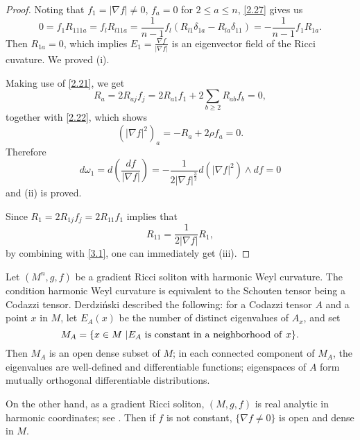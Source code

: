 \documentclass{amsart}
\theoremstyle{definition}
\theoremstyle{remark}
\numberwithin{equation}{section}
\begin{document}
	\begin{proof}
		Noting that 
		$f_1=|\nabla f|\neq 0$, $f_a=0$ for $2\leq a\leq n$, \eqref{2.27} gives us
		\[
		0=f_1 R_{111a}= f_l R_{l11a}=\frac{1}{n - 1} f_l \left( R_{l1} \delta_{1a} - R_{la} \delta_{11}\right) =-\frac{1}{n - 1}f_1 R_{1a}.	
		\]
		Then $R_{1a}=0$, which implies $E_1= \frac{\nabla f }{|\nabla f | }$ is an eigenvector field of the Ricci cuvature. We proved {\rm (i)}.
		
		Making use of \eqref{2.21}, we get
		\begin{equation}\label{3.1}
		R_a=2R_{aj}f_j=2R_{a1}f_1+2\sum_{b\geq2}R_{ab}f_b=0,
		\end{equation}
		together with \eqref{2.22}, which shows 
		\[
		\left(  \left| \nabla f \right|^ 2\right)_a =-R_a + 2\rho f_a =0.
		\]
		Therefore 
		\[
		d\omega_1 = d\left( \frac{d f}{|\nabla f|}\right) 
		=-\frac{1}{2 |\nabla f|^{\frac{3}{2}}} d \left( |\nabla f|^{2}\right)  \wedge df
		=0
		\]
		and {\rm (ii)} is proved.
		
		Since $R_1=2R_{1j}f_j=2R_{11}f_1$ implies that
		\[
		R_{11}=\frac{1}{2 |\nabla f|}R_1,
		\]
		by combining with \eqref{3.1}, one can immediately get {\rm (iii)}.
	\end{proof}
	
	Let $(M^n,g,f)$ be a gradient Ricci soliton with harmonic Weyl curvature. 
	The condition harmonic Weyl curvature is equivalent to the Schouten tensor being a Codazzi tensor. 
	Derdzi\'{n}ski \cite{De} described the following: for a Codazzi tensor $A$ and a point $x$ in $M$, 
	let $E_A(x)$ be the number of distinct eigenvalues of $A_x$,
	and set 
	\[
	M_A = \{  x \in M \ | E_A {\rm \ is \ constant \ in \ a \ neighborhood \ of \ } x \}.
	\] 
	Then $M_A$ is an open dense subset of $M$;
	in each connected component of $M_A$, 
	the eigenvalues are well-defined and differentiable functions;
	eigenspaces of $A$ form mutually orthogonal differentiable distributions.
	
	On the other hand, as a gradient Ricci soliton, 
	$(M,g,f)$ is real analytic in harmonic coordinates; see \cite{Iv, HPW}. 
	Then if $f$ is not constant, $\{\nabla f \neq 0\}$ is open and dense in $M$.  
	
\end{document}
